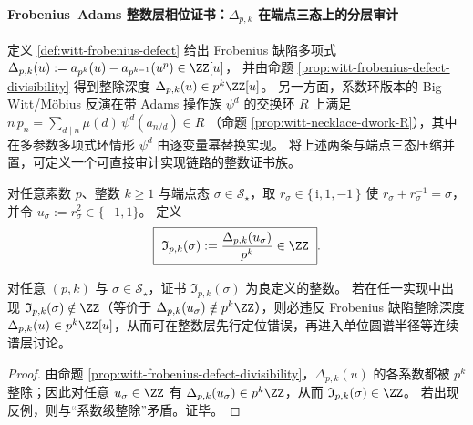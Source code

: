 \paragraph{Frobenius--Adams 整数层相位证书：\texorpdfstring{$\Delta_{p,k}$}{Delta} 在端点三态上的分层审计}
定义 \ref{def:witt-frobenius-defect} 给出 Frobenius 缺陷多项式
\(
\Delta_{p,k}(u):=a_{p^k}(u)-a_{p^{k-1}}(u^p)\in\ZZ[u]
\)，
并由命题 \ref{prop:witt-frobenius-defect-divisibility} 得到整除深度
\(
\Delta_{p,k}(u)\in p^k\ZZ[u]
\)。
另一方面，系数环版本的 Big-Witt/Möbius 反演在带 Adams 操作族 \(\psi^d\) 的交换环 \(R\) 上满足
\(
n\,p_n=\sum_{d\mid n}\mu(d)\,\psi^d(a_{n/d})\in R
\)
（命题 \ref{prop:witt-necklace-dwork-R}），其中在多参数多项式环情形 \(\psi^d\) 由逐变量幂替换实现。
将上述两条与端点三态压缩并置，可定义一个可直接审计实现链路的整数证书族。

\begin{definition}\label{def:endpoint-frobenius-integer-certificate}
对任意素数 \(p\)、整数 \(k\ge 1\) 与端点态 \(\sigma\in\mathcal S_{\star}\)，取 \(r_\sigma\in\{\,\mathrm{i},1,-1\,\}\) 使 \(r_\sigma+r_\sigma^{-1}=\sigma\)，并令 \(u_\sigma:=r_\sigma^{2}\in\{-1,1\}\)。
定义
\begin{equation}\label{eq:endpoint-frobenius-integer-certificate}
\boxed{\ \mathfrak I_{p,k}(\sigma):=\frac{\Delta_{p,k}(u_{\sigma})}{p^{k}}\in\ZZ\ }.
\end{equation}
\end{definition}

\begin{proposition}\label{prop:endpoint-frobenius-integer-certificate-auditable}
对任意 \((p,k)\) 与 \(\sigma\in\mathcal S_{\star}\)，证书 \(\mathfrak I_{p,k}(\sigma)\) 为良定义的整数。
若在任一实现中出现 \(\mathfrak I_{p,k}(\sigma)\notin\ZZ\)（等价于 \(\Delta_{p,k}(u_\sigma)\notin p^k\ZZ\)），则必违反 Frobenius 缺陷整除深度 \(\Delta_{p,k}(u)\in p^k\ZZ[u]\)，从而可在整数层先行定位错误，再进入单位圆谱半径等连续谱层讨论。
\end{proposition}
\begin{proof}
由命题 \ref{prop:witt-frobenius-defect-divisibility}，\(\Delta_{p,k}(u)\) 的各系数都被 \(p^k\) 整除；因此对任意 \(u_\sigma\in\ZZ\) 有 \(\Delta_{p,k}(u_\sigma)\in p^k\ZZ\)，从而 \(\mathfrak I_{p,k}(\sigma)\in\ZZ\)。
若出现反例，则与“系数级整除”矛盾。证毕。
\end{proof}

